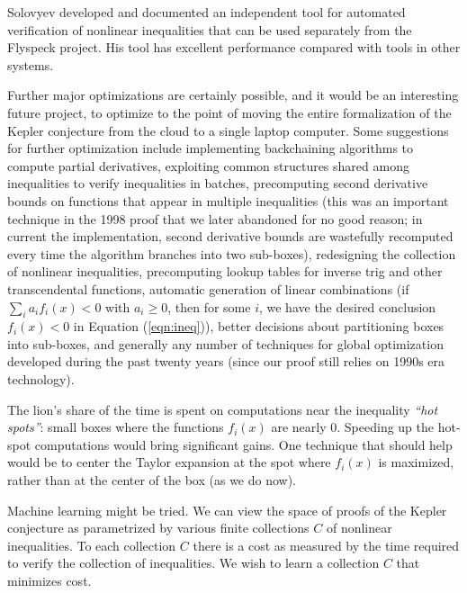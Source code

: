 \documentclass{amsart}
\begin{document}
Solovyev developed and documented an independent tool for automated
verification of nonlinear inequalities that can be used separately
from the Flyspeck project.  His tool has excellent performance
compared with tools in other systems.

Further major optimizations are certainly possible, and it would be an
interesting future project, to optimize to the point of moving the
entire formalization of the Kepler conjecture from the cloud to a
single laptop computer.  Some suggestions for further optimization
include implementing backchaining algorithms to compute partial
derivatives, exploiting common structures shared among inequalities to
verify inequalities in batches, precomputing second derivative bounds
on functions that appear in multiple inequalities (this was an
important technique in the 1998 proof that we later abandoned for no
good reason; in current the implementation, second derivative bounds
are wastefully recomputed every time the algorithm branches into two
sub-boxes), redesigning the collection of nonlinear inequalities,
precomputing lookup tables for inverse trig and other transcendental
functions, automatic generation of linear combinations (if $\sum_i a_i
f_i(x) < 0$ with $a_i\ge 0$, then for some $i$, we have the desired
conclusion $f_i(x) < 0$ in Equation (\ref{eqn:ineq})), better
decisions about partitioning boxes into sub-boxes, and generally any
number of techniques for global optimization developed during the past
twenty years (since our proof still relies on 1990s era technology).


The lion's share of the time is spent on computations near the
inequality \emph{``hot spots''}: small boxes where the functions
$f_i(x)$ are nearly $0$.  Speeding up the hot-spot computations would
bring significant gains.  One technique that should help would be to
center the Taylor expansion at the spot where $f_i(x)$ is maximized,
rather than at the center of the box (as we do now).

Machine learning might be tried.  We can view the space of proofs of
the Kepler conjecture as parametrized by various finite collections
$C$ of nonlinear inequalities.  To each collection $C$ there is a cost
as measured by the time required to verify the collection of
inequalities.  We wish to learn a collection $C$ that minimizes cost.

\newpage


 

\end{document}
